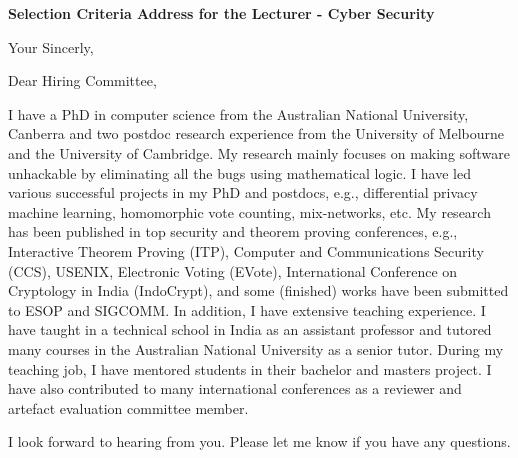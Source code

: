\documentclass[11pt,a4paper,roman]{moderncv}
\begin{document}
\date{}
\opening{\textbf{Selection Criteria Address for the Lecturer - Cyber Security}}
\closing{Your Sincerly, \vspace{-1em}}



\makelettertitle

Dear Hiring Committee, 


I have a PhD in computer science from the Australian National University, 
Canberra and two postdoc research experience from the University of 
Melbourne and the University of Cambridge.  
My research 
mainly focuses on making software unhackable by eliminating all 
the bugs using mathematical logic. I have led various successful projects
in my PhD and postdocs, e.g., differential privacy machine learning, 
homomorphic vote counting, mix-networks, etc.  My research has been 
published in top security and theorem proving conferences, e.g., 
Interactive Theorem Proving (ITP), 
Computer and Communications Security (CCS), USENIX, Electronic Voting (EVote), 
International Conference on Cryptology in India (IndoCrypt),
and some (finished) works have been submitted to ESOP and SIGCOMM. 
In addition, I have extensive teaching experience. I have taught in 
a technical school in India as an assistant professor and tutored 
many courses in the Australian National University as a senior tutor.
During my teaching job, I have mentored students in their bachelor and 
masters project. I have also contributed to many international conferences 
as a reviewer and artefact evaluation committee member.




I look forward to hearing from you. Please let me know if you have any questions. \\
 


\makeletterclosing
\end{document}
